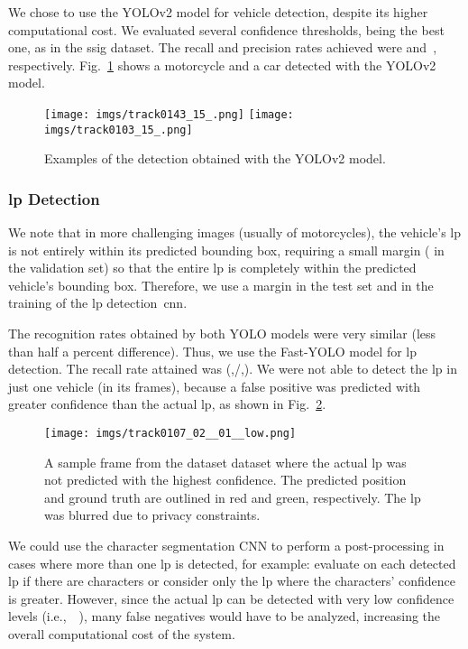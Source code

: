 We chose to use the YOLOv2 model for vehicle detection, despite its higher computational cost. We evaluated several confidence thresholds, being  the best one, as in the \gls*{ssig} dataset. The recall and precision rates achieved were  and~, respectively. 
Fig.~\ref{fig:vehicle_detect_ufpr} shows a motorcycle and a car detected with the YOLOv2 model.

\begin{figure}[!htb]
	\centering
	\texttt{[image: imgs/track0143\_15\_.png]}
	\texttt{[image: imgs/track0103\_15\_.png]}
	\caption{Examples of the detection obtained with the YOLOv2 model.}
	\label{fig:vehicle_detect_ufpr}    
\end{figure}

\subsubsection{\gls*{lp} Detection}

We note that in more challenging images (usually of motorcycles), the vehicle's \gls*{lp} is not entirely within its predicted bounding box, requiring a small margin ( in the validation set) so that the entire \gls*{lp} is completely within the predicted vehicle's bounding box. Therefore, we use a  margin in the test set and in the training of the \gls*{lp} detection~\gls*{cnn}. 

The recognition rates obtained by both YOLO models were very similar (less than half a percent difference). Thus, we use the Fast-YOLO model for \gls*{lp} detection. The recall rate attained was  (,/,). We were not able to detect the \gls*{lp} in just one vehicle (in its  frames), because a false positive was predicted with greater confidence than the actual \gls*{lp}, as shown in Fig.~\ref{fig:dataset_lp_fp}.

\begin{figure}[!htb]
	\centering
	\texttt{[image: imgs/track0107\_02\_\_01\_\_low.png]}
	\caption{A sample frame from the \gls*{dataset} dataset where the actual \gls*{lp} was not predicted with the highest confidence. The predicted position and ground truth are outlined in red and green, respectively. The \gls*{lp} was blurred due to privacy constraints.}
	\label{fig:dataset_lp_fp}    
\end{figure}

We could use the character segmentation CNN to perform a post-processing in cases where more than one \gls*{lp} is detected, for example: evaluate on each detected \gls*{lp} if there are  characters or consider only the \gls*{lp} where the characters’ confidence is greater. However, since the actual \gls*{lp} can be detected with very low confidence levels (i.e.,~~), many false negatives would have to be analyzed, increasing the overall computational cost of the system.

